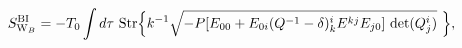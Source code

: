 \begin{equation}
\label{IIBwavesBI}
S^{\rm BI}_{{\rm W}_B}=-T_0\int d\tau~ {\rm Str}\Bigl\{ k^{-1}
\sqrt{-P[E_{00}+E_{0i}(Q^{-1}-\delta)^i_k
E^{kj}E_{j0}] \ {\rm det} (Q^i_j )}
\ \Bigr\},
\end{equation}

